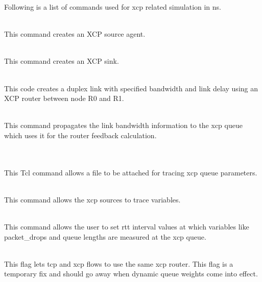   Following is a list of commands used for xcp related simulation in ns.
  \begin{flushleft}

    \\
    This command creates an XCP source agent.

    \\
    This command creates an XCP sink.

    \\
    This code creates a duplex link with specified bandwidth and link
    delay using an XCP router between node R0 and R1.

    \\
    This command propagates the link bandwidth information to the xcp
    queue which uses it for the router feedback calculation.

     \\
    \\
    This Tcl command allows a file to be attached for tracing xcp queue
    parameters. 
    
    \\
    This command allows the xcp sources to trace variables.
    
    \\ %
    This command allows the user to set rtt interval values at which
    variables like packet\_drops and queue lengths are measured at the
    xcp queue.

    \\
    This flag lets tcp and xcp flows to use the same xcp router. This
    flag is a temporary fix and should go away when dynamic queue
    weights come into effect.
    
  \end{flushleft}
